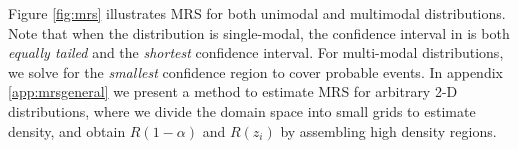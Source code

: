 Figure \ref{fig:mrs} illustrates MRS for both unimodal and multimodal distributions.  Note that when the distribution is single-modal, the confidence interval in  is both \textit{equally tailed} and the \textit{shortest} confidence interval. For  multi-modal distributions,  we solve for the \textit{smallest} confidence region to cover probable events. In appendix \ref{app:mrsgeneral} we present a method to estimate MRS for arbitrary 2-D distributions, where we divide the domain space into small grids to estimate density, and obtain $R(1-\alpha)$ and $R(z_i)$ by assembling high density regions.
%



